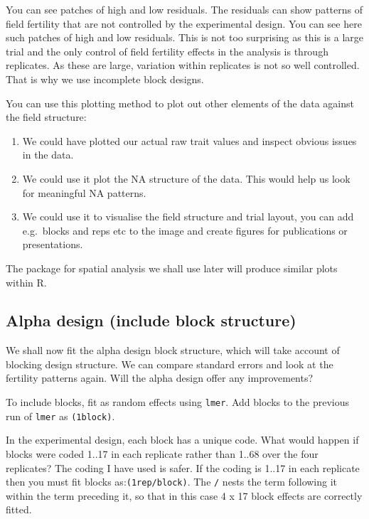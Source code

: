 \documentclass[
]{book}
\makeatletter
\providecommand{\tightlist}{%
  \setlength{\itemsep}{0pt}\setlength{\parskip}{0pt}}
\newenvironment{kframe}{%
\medskip{}
\setlength{\fboxsep}{.8em}
 \def\at@end@of@kframe{}%
 \ifinner\ifhmode%
  \def\at@end@of@kframe{\end{minipage}}%
  \begin{minipage}{\columnwidth}%
 \fi\fi%
 \def\FrameCommand##1{\hskip\@totalleftmargin \hskip-\fboxsep
 \colorbox{shadecolor}{##1}\hskip-\fboxsep
     \hskip-\linewidth \hskip-\@totalleftmargin \hskip\columnwidth}%
 \MakeFramed {\advance\hsize-\width
   \@totalleftmargin\z@ \linewidth\hsize
   \@setminipage}}%
 {\par\unskip\endMakeFramed%
 \at@end@of@kframe}
\newenvironment{rmdblock}[1]
  {
  \begin{itemize}
  \renewcommand{\labelitemi}{
    \raisebox{-.7\height}[0pt][0pt]{
      {\setkeys{Gin}{width=3em,keepaspectratio}\texttt{[image: images/\#1]}}
    }
  }
  \setlength{\fboxsep}{1em}
  \begin{kframe}
  \item
  }
  {
  \end{kframe}
  \end{itemize}
  }
\newenvironment{rmdnote}
  {\begin{rmdblock}{note}}
  {\end{rmdblock}}
\makeatother
\begin{document}
You can see patches of high and low residuals. The residuals can show patterns of field fertility that are not controlled by the experimental design. You can see here such patches of high and low residuals. This is not too surprising as this is a large trial and the only control of field fertility effects in the analysis is through replicates. As these are large, variation within replicates is not so well controlled. That is why we use incomplete block designs.

You can use this plotting method to plot out other elements of the data against the field structure:

\begin{enumerate}
\def\labelenumi{\arabic{enumi}.}
\tightlist
\item
  We could have plotted our actual raw trait values and inspect obvious issues in the data.
\item
  We could use it plot the NA structure of the data. This would help us look for meaningful NA patterns.
\item
  We could use it to visualise the field structure and trial layout, you can add e.g.~blocks and reps etc to the image and create figures for publications or presentations.
\end{enumerate}

The package for spatial analysis we shall use later will produce similar plots within R.

\hypertarget{alpha-design-include-block-structure}{%
\subsection{Alpha design (include block structure)}\label{alpha-design-include-block-structure}}

We shall now fit the alpha design block structure, which will take account of blocking design structure. We can compare standard errors and look at the fertility patterns again. Will the alpha design offer any improvements?

To include blocks, fit as random effects using \texttt{lmer}. Add blocks to the previous run of \texttt{lmer} as \texttt{(1\textbar{}block)}.

\begin{rmdnote}
In the experimental design, each block has a unique code. What would happen if blocks were coded 1..17 in each replicate rather than 1..68 over the four replicates? The coding I have used is safer. If the coding is 1..17 in each replicate then you must fit blocks as:\texttt{(1\textbar{}rep/block)}. The \texttt{/} nests the term following it within the term preceding it, so that in this case 4 x 17 block effects are correctly fitted.
\end{rmdnote}
\end{document}
